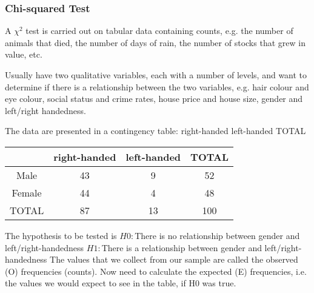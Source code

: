 \documentclass[a4paper,12pt]{article}
\begin{document}

\subsubsection{Chi-squared Test}

A $\chi^2$ test is carried out on tabular data containing counts, e.g. the
number of animals that died, the number of days of rain, the
number of stocks that grew in value, etc.

Usually have two qualitative variables, each with a number of
levels, and want to determine if there is a relationship between the
two variables, e.g. hair colour and eye colour, social status and
crime rates, house price and house size, gender and left/right
handedness.

The data are presented in a contingency table:
right-handed left-handed TOTAL

\begin{tabular}{|c|c|c|c|}
	\hline
	& right-handed &left-handed & TOTAL\\\hline
	Male & 43 & 9 & 52 \\
	Female & 44 & 4 & 48 \\
	TOTAL & 87 & 13 & 100 \\
	\hline
\end{tabular}


The hypothesis to be tested is
$H0 :$There is no relationship between gender and left/right-handedness
$H1 :$There is a relationship between gender and left/right-handedness
The values that we collect from our sample are called the observed
(O) frequencies (counts). Now need to calculate the expected (E)
frequencies, i.e. the values we would expect to see in the table, if
H0 was true.
\end{document}
